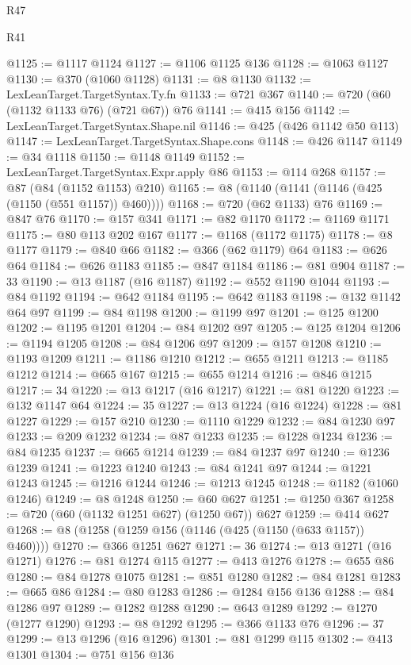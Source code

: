 \begin{lexlean}{R47}
\begin{lexlean}{R41}
\begin{coremodule}
{{{{{{{{{{{{{{{{{{{{{{{{{{{{{{{{{{{{{{{{{{{{{{{{{{{{{{{{{{{{{{{{{{{{{{{{{{{{{{{{{{{{{{{@1125 := @1117 @1124
@1127 := @1106 @1125 @136
@1128 := @1063 @1127
@1130 := @370 (@1060 @1128)
@1131 := @8 @1130
@1132 := LexLeanTarget.TargetSyntax.Ty.fn
@1133 := @721 @367
@1140 := @720 (@60 (@1132 @1133 @76) (@721 @67)) @76
@1141 := @415 @156
@1142 := LexLeanTarget.TargetSyntax.Shape.nil
@1146 := @425 (@426 @1142 @50 @113)
@1147 := LexLeanTarget.TargetSyntax.Shape.cons
@1148 := @426 @1147
@1149 := @34 @1118
@1150 := @1148 @1149
@1152 := LexLeanTarget.TargetSyntax.Expr.apply @86
@1153 := @114 @268
@1157 := @87 (@84 (@1152 @1153) @210)
@1165 := @8 (@1140 (@1141 (@1146 (@425 (@1150 (@551 @1157)) @460))))
@1168 := @720 (@62 @1133) @76
@1169 := @847 @76
@1170 := @157 @341
@1171 := @82 @1170
@1172 := @1169 @1171
@1175 := @80 @113 @202 @167
@1177 := @1168 (@1172 @1175)
@1178 := @8 @1177
@1179 := @840 @66
@1182 := @366 (@62 @1179) @64
@1183 := @626 @64
@1184 := @626 @1183
@1185 := @847 @1184
@1186 := @81 @904
@1187 := 33
@1190 := @13 @1187 (@16 @1187)
@1192 := @552 @1190 @1044
@1193 := @84 @1192
@1194 := @642 @1184
@1195 := @642 @1183
@1198 := @132 @1142 @64 @97
@1199 := @84 @1198
@1200 := @1199 @97
@1201 := @125 @1200
@1202 := @1195 @1201
@1204 := @84 @1202 @97
@1205 := @125 @1204
@1206 := @1194 @1205
@1208 := @84 @1206 @97
@1209 := @157 @1208
@1210 := @1193 @1209
@1211 := @1186 @1210
@1212 := @655 @1211
@1213 := @1185 @1212
@1214 := @665 @167
@1215 := @655 @1214
@1216 := @846 @1215
@1217 := 34
@1220 := @13 @1217 (@16 @1217)
@1221 := @81 @1220
@1223 := @132 @1147 @64
@1224 := 35
@1227 := @13 @1224 (@16 @1224)
@1228 := @81 @1227
@1229 := @157 @210
@1230 := @1110 @1229
@1232 := @84 @1230 @97
@1233 := @209 @1232
@1234 := @87 @1233
@1235 := @1228 @1234
@1236 := @84 @1235
@1237 := @665 @1214
@1239 := @84 @1237 @97
@1240 := @1236 @1239
@1241 := @1223 @1240
@1243 := @84 @1241 @97
@1244 := @1221 @1243
@1245 := @1216 @1244
@1246 := @1213 @1245
@1248 := @1182 (@1060 @1246)
@1249 := @8 @1248
@1250 := @60 @627
@1251 := @1250 @367
@1258 := @720 (@60 (@1132 @1251 @627) (@1250 @67)) @627
@1259 := @414 @627
@1268 := @8 (@1258 (@1259 @156 (@1146 (@425 (@1150 (@633 @1157)) @460))))
@1270 := @366 @1251 @627
@1271 := 36
@1274 := @13 @1271 (@16 @1271)
@1276 := @81 @1274 @115
@1277 := @413 @1276
@1278 := @655 @86
@1280 := @84 @1278 @1075
@1281 := @851 @1280
@1282 := @84 @1281
@1283 := @665 @86
@1284 := @80 @1283
@1286 := @1284 @156 @136
@1288 := @84 @1286 @97
@1289 := @1282 @1288
@1290 := @643 @1289
@1292 := @1270 (@1277 @1290)
@1293 := @8 @1292
@1295 := @366 @1133 @76
@1296 := 37
@1299 := @13 @1296 (@16 @1296)
@1301 := @81 @1299 @115
@1302 := @413 @1301
@1304 := @751 @156 @136
}}}}}}}}}}}}}}}}}}}}}}}}}}}}}}}}}}}}}}}}}}}}}}}}}}}}}}}}}}}}}}}}}}}}}}}}}}}}}}}}}}}}}}}
\end{coremodule}
\end{lexlean}
\end{lexlean}
